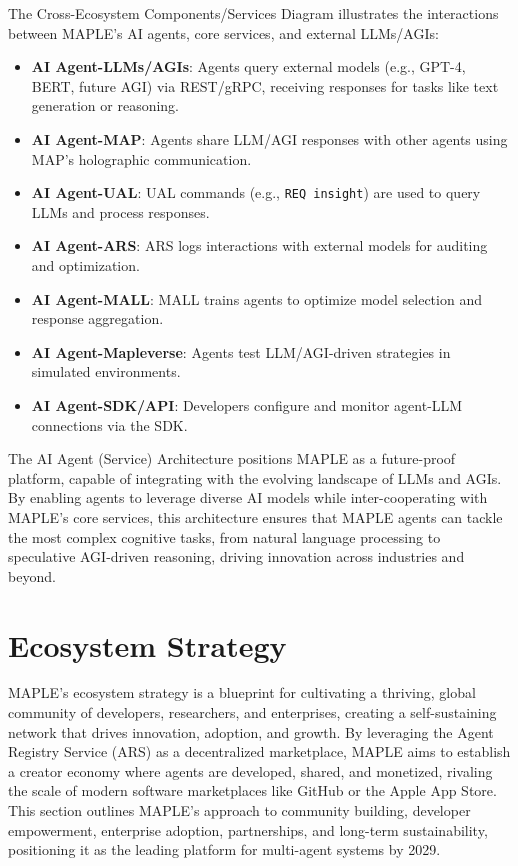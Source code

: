 \documentclass[a4paper,11pt]{article}
\begin{document}
The Cross-Ecosystem Components/Services Diagram illustrates the interactions between MAPLE’s AI agents, core services, and external LLMs/AGIs:
\begin{itemize}[leftmargin=*]
    \item \textbf{AI Agent-LLMs/AGIs}: Agents query external models (e.g., GPT-4, BERT, future AGI) via REST/gRPC, receiving responses for tasks like text generation or reasoning.
    \item \textbf{AI Agent-MAP}: Agents share LLM/AGI responses with other agents using MAP’s holographic communication.
    \item \textbf{AI Agent-UAL}: UAL commands (e.g., \texttt{REQ insight}) are used to query LLMs and process responses.
    \item \textbf{AI Agent-ARS}: ARS logs interactions with external models for auditing and optimization.
    \item \textbf{AI Agent-MALL}: MALL trains agents to optimize model selection and response aggregation.
    \item \textbf{AI Agent-Mapleverse}: Agents test LLM/AGI-driven strategies in simulated environments.
    \item \textbf{AI Agent-SDK/API}: Developers configure and monitor agent-LLM connections via the SDK.
\end{itemize}

The AI Agent (Service) Architecture positions MAPLE as a future-proof platform, capable of integrating with the evolving landscape of LLMs and AGIs. By enabling agents to leverage diverse AI models while inter-cooperating with MAPLE’s core services, this architecture ensures that MAPLE agents can tackle the most complex cognitive tasks, from natural language processing to speculative AGI-driven reasoning, driving innovation across industries and beyond.

\pagebreak

\section{Ecosystem Strategy}
MAPLE’s ecosystem strategy is a blueprint for cultivating a thriving, global community of developers, researchers, and enterprises, creating a self-sustaining network that drives innovation, adoption, and growth. By leveraging the Agent Registry Service (ARS) as a decentralized marketplace, MAPLE aims to establish a creator economy where agents are developed, shared, and monetized, rivaling the scale of modern software marketplaces like GitHub or the Apple App Store. This section outlines MAPLE’s approach to community building, developer empowerment, enterprise adoption, partnerships, and long-term sustainability, positioning it as the leading platform for multi-agent systems by 2029.
\end{document}
